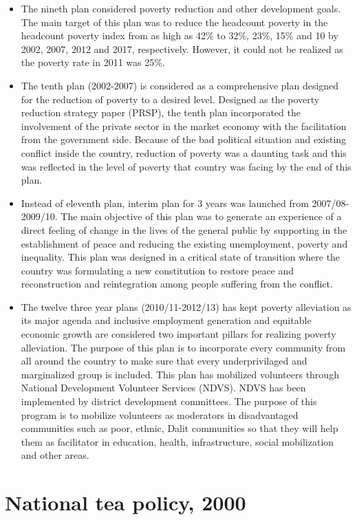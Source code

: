 \documentclass[
  openany]{book}
\providecommand{\tightlist}{%
  \setlength{\itemsep}{0pt}\setlength{\parskip}{0pt}}
\begin{document}
\begin{itemize}
\tightlist
\item
  The nineth plan considered poverty reduction and other development goals. The main target of this plan was to reduce the headcount poverty in the headcount poverty index from as high as 42\% to 32\%, 23\%, 15\% and 10 by 2002, 2007, 2012 and 2017, respectively. However, it could not be realized as the poverty rate in 2011 was 25\%.
\item
  The tenth plan (2002-2007) is considered as a comprehensive plan designed for the reduction of poverty to a desired level. Designed as the poverty reduction strategy paper (PRSP), the tenth plan incorporated the involvement of the private sector in the market economy with the facilitation from the government side. Because of the bad political situation and existing conflict inside the country, reduction of poverty was a daunting task and this was reflected in the level of poverty that country was facing by the end of this plan.
\item
  Instead of eleventh plan, interim plan for 3 years was launched from 2007/08-2009/10. The main objective of this plan was to generate an experience of a direct feeling of change in the lives of the general public by supporting in the establishment of peace and reducing the existing unemployment, poverty and inequality. This plan was designed in a critical state of transition where the country was formulating a new constitution to restore peace and reconstruction and reintegration among people suffering from the conflict.
\item
  The twelve three year plans (2010/11-2012/13) has kept poverty alleviation as its major agenda and inclusive employment generation and equitable economic growth are considered two important pillars for realizing poverty alleviation. The purpose of this plan is to incorporate every community from all around the country to make sure that every underprivilaged and marginalized group is included. This plan has mobilized volunteers through National Development Volunteer Services (NDVS). NDVS has been implemented by district development committees. The purpose of this program is to mobilize volunteers as moderators in disadvantaged communities such as poor, ethnic, Dalit communities so that they will help them as facilitator in education, health, infrastructure, social mobilization and other areas.
\end{itemize}

\hypertarget{national-tea-policy-2000}{%
\section{National tea policy, 2000}\label{national-tea-policy-2000}}
\end{document}
